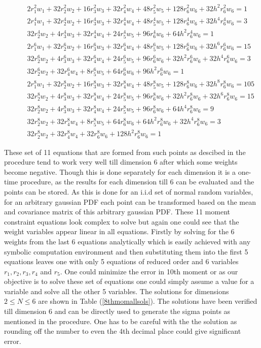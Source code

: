 \documentclass[letterpaper, 10 pt, conference]{ieeeconf}  %
\begin{document}
\begin{figure}[!t]
\small
\setlength{\arraycolsep}{0.0em}
\begin{eqnarray}
2r_1^2w_1+32r_2^2w_2+16r_3^2w_3+32r_4^2w_4+48r_5^2w_5+128r_6^2w_6+32h^2r_6^2w_6=1\nonumber\\
2r_1^4w_1+32r_2^4w_2+16r_3^4w_3+32r_4^4w_4+48r_5^4w_5+128r_6^4w_6+32h^4r_6^4w_6=3\nonumber\\
32r_2^4w_2+4r_3^4w_3+32r_4^4w_4+24r_5^4w_5+96r_6^4w_6+64h^2r_6^4w_6=1\nonumber\\
2r_1^6w_1+32r_2^6w_2+16r_3^6w_3+32r_4^6w_4+48r_5^6w_5+128r_6^6w_6+32h^6r_6^6w_6=15\nonumber\\
32r_2^6w_2+4r_3^6w_3+32r_4^6w_4+24r_5^6w_5+96r_6^6w_6+32h^2r_6^6w_6+32h^4r_6^6w_6=3\nonumber\\
32r_2^6w_2+32r_4^6w_4+8r_5^6w_5+64r_6^6w_6+96h^2r_6^6w_6=1\nonumber\\
2r_1^8w_1+32r_2^8w_2+16r_3^8w_3+32r_4^8w_4+48r_5^8w_5+128r_6^8w_6+32h^8r_6^8w_6=105\nonumber\\
32r_2^8w_2+4r_3^8w_3+32r_4^8w_4+24r_5^8w_5+96r_6^8w_6+32h^2r_6^8w_6+32h^6r_6^8w_6=15\nonumber\\
32r_2^8w_2+4r_3^8w_3+32r_4^8w_4+24r_5^8w_5+96r_6^8w_6+64h^4r_6^8w_6=9\nonumber\\
32r_2^8w_2+32r_4^8w_4+8r_5^8w_5+64r_6^8w_6+64h^2r_6^8w_6+32h^4r_6^8w_6=3\nonumber\\
32r_2^8w_2+32r_4^8w_4+32r_6^8w_6+128h^2r_6^8w_6=1 \label{8thmom5deqns}
\end{eqnarray}
\setlength{\arraycolsep}{5pt}
\hrulefill
\vspace*{4pt}
\end{figure}
These set of 11 equations that are formed from such points as descibed in the procedure tend to work very well till dimension 6 after which some weights become negative. Though this is done separately for each dimension it is a one-time procedure, as the results for each dimension till 6 can be evaluated and the points can be stored. As this is done for an i.i.d set of normal random variables, for an arbitrary gaussian PDF each point can be transformed based on the mean and covariance matrix of this arbitrary gaussian PDF. These 11 moment constraint equations look complex to solve but again one could see that the weight variables appear linear in all equations. Firstly by solving for the 6 weights from the last 6 equations analytically which is easily achieved with any symbolic computation environment and then substituting them into the first 5 equations leaves one with only 5 equations of reduced order and 6 variables $r_1,r_2,r_3,r_4$ and $r_5$. One could minimize the error in 10th moment or as our objective is to solve these set of equations one could simply assume a value for a variable and solve all the other 5 variables. The solutions for dimensions $2\le N \le 6$ are shown in Table (\ref{8thmomallsols}). The solutions have been verified till dimension 6 and can be directly used to generate the sigma points as mentioned in the procedure. One has to be careful with the the solution as rounding off the number to even the 4th decimal place could give significant error.   
\end{document}

